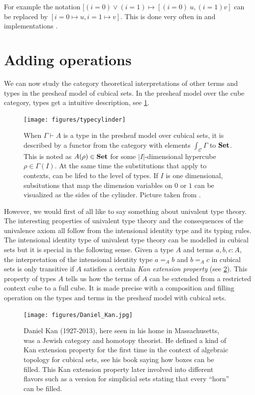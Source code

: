 \documentclass[12pt,a4paper,twoside,xetex,draft]{book}
\newcommand{\keyword}[1]{\emph{#1}\index{#1}}
\begin{document}
For example the notation $[(i = 0) \vee (i=1) \mapsto [(i=0) \ u, (i=1) v]$ can be replaced by $[i=0 \mapsto u, i=1 \mapsto v]$. This is done very often in \cite{Huber2016} and implementations \cite{Moertberg2018}.

\section{Adding operations}\label{extraops}

We can now study the category theoretical interpretations of other terms and types in the presheaf model of cubical sets. In the presheaf model over the cube category, types get a intuitive description, see \cref{hubtypes}. 

\begin{figure}\label{hubtypes}
 \centering
 
 \texttt{[image: figures/typecylinder]}
 
 \caption{When $\Gamma \vdash A$ is a type in the presheaf model over cubical sets, it is described by a functor from the category with elements $\int_{\mathcal{C}} \Gamma$ to $\text{\textbf{Set}}$. 
 This is noted as $A(\rho) \in \text{\textbf{Set}}$ for some $|I|$-dimensional hypercube $\rho \in \Gamma (I)$. At the same time the substitutions that apply to contexts, can be lifed to the level of types. If $I$ is one dimensional, subsitutions that map the dimension variables on $0$ or $1$ can be visualized as the sides of the cylinder. Picture taken from \cite{Huber2016def}.}
\end{figure}


However, we would first of all like to say something about univalent type theory. The interesting properties of univalent type theory and the consequences of the univalence axiom all follow from the intensional identity type and its typing rules. The intensional identity type of univalent type theory can be modelled in cubical sets but it is special in the following sense. Given a type $A$ and terms $a,b,c:A$, the interpretation of the intensional identity type $a =_A b$ and $b=_A c$  in cubical sets is only transitive if $A$ satisfies a certain \keyword{Kan extension property} (see \cref{fig:Kan}). This property of types $A$ tells us how the terms of $A$ can be extended from a restricted context cube to a full cube. It is made precise with a composition and filling operation on the types and terms in the presheaf model with cubical sets.

\begin{figure}
\begin{centering}
\texttt{[image: figures/Daniel\_Kan.jpg]}
\par\end{centering}
\caption{\label{fig:Kan}Daniel Kan (1927-2013), here seen in his home in Massachusetts, was a Jewish category and homotopy theorist. He defined  a kind of Kan extension property for the first time in the context of algebraic topology for cubical sets, see his book \cite{Kan1955} saying how boxes can be filled. This Kan extension property later involved into different flavors such as a version for simplicial sets stating that every ``horn'' can be filled.}
\end{figure}
\end{document}
